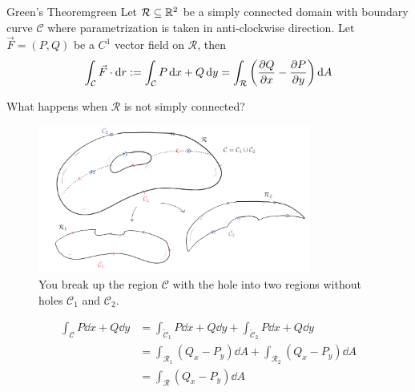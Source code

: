 \documentclass[../Analysis-3]{subfiles}
\begin{document}
\begin{Thm}{Green's Theorem}{green}
    Let $\mathcal{R} \subseteq \mathbb{R}^2 $ be a simply connected domain with boundary curve $\mathcal{C}$ where parametrization is taken in anti-clockwise direction. Let $\vec{F} = (P,Q)$ be a $C^1$ vector field on $\mathcal{R}$, then
    \[
        \int_{\mathcal{C}} \vec{F} \cdot \dd r := \int_{\mathcal{C}} P \, \dd x + Q \, \dd y = \int_{\mathcal{R}} \left( \pdv{Q}{x} - \pdv{P}{y}\right) \dd A
    \]
\end{Thm}

What happens when $\mathcal{R}$ is not simply connected?
\begin{figure}[H]
    \centering
    \includegraphics[width=0.8\textwidth]{../figures/lec27.5.png}
    \caption{You break up the region $\mathcal{C}$ with the hole into two regions without holes $\mathcal{C}_1$ and $\mathcal{C}_2$.}
    \label{fig5:27}
\end{figure}
\begin{align*}
    \int_{\mathcal{C}} P \dd x + Q \dd y & = \int_{\tilde{\mathcal{C}}_1} P \dd x + Q \dd y + \int_{\tilde{\mathcal{C}}_2} P \dd x + Q \dd y \\
                                         & = \int_{\mathcal{R}_1} (Q_x - P_y) \dd A + \int_{\mathcal{R}_2} (Q_x - P_y) \dd A                 \\
                                         & = \int_{\mathcal{R}} (Q_x - P_y) \dd A
\end{align*}
\end{document}
